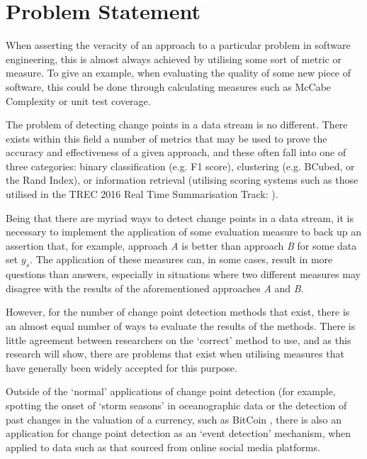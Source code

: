 \documentclass{uvamscse}	%
\begin{document}
\section{Problem Statement}
\label{Problem Statement}

When asserting the veracity of an approach to a particular problem in software engineering, this is almost always achieved by utilising some sort of metric or measure. To give an example, when evaluating the quality of some new piece of software, this could be done through calculating measures such as McCabe Complexity \cite{ThomasJ.McCabe1976} or unit test coverage.

The problem of detecting change points in a data stream is no different. There exists within this field a number of metrics that may be used to prove the accuracy and effectiveness of a given approach, and these often fall into one of three categories: binary classification (e.g. F1 score), clustering (e.g. BCubed, or the Rand Index), or information retrieval (utilising scoring systems such as those utilised in the TREC 2016 Real Time Summarisation Track: \cite{trec2016}).

Being that there are myriad ways to detect change points in a data stream, it is necessary to implement the application of some evaluation measure to back up an assertion that, for example, approach \emph{A} is better than approach \emph{B} for some data set $y_s$. The application of these measures can, in some cases, result in more questions than answers, especially in situations where two different measures may disagree with the results of the aforementioned approaches \emph{A} and \emph{B}.

However, for the number of change point detection methods that exist, there is an almost equal number of ways to evaluate the results of the methods. There is little agreement between researchers on the `correct' method to use, and as this research will show, there are problems that exist when utilising measures that have generally been widely accepted for this purpose.

Outside of the `normal' applications of change point detection (for example, spotting the onset of `storm seasons' in oceanographic data \cite{Killick2011} or the detection of past changes in the valuation of a currency, such as BitCoin \cite{Buntain2014}, there is also an application for change point detection as an `event detection' mechanism, when applied to data such as that sourced from online social media platforms.
\end{document}
